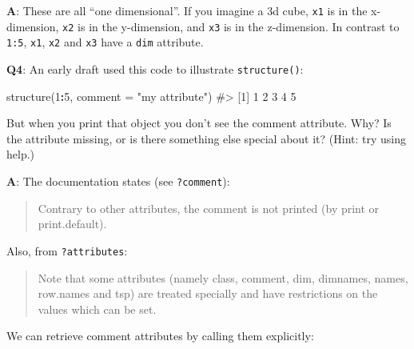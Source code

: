\documentclass[
]{krantz}
\makeatletter
\newenvironment{Shaded}{\begin{snugshade}}{\end{snugshade}}
\newcommand{\CommentTok}[1]{\textcolor[rgb]{0.56,0.35,0.01}{\textit{#1}}}
\newcommand{\DataTypeTok}[1]{\textcolor[rgb]{0.13,0.29,0.53}{#1}}
\newcommand{\DecValTok}[1]{\textcolor[rgb]{0.00,0.00,0.81}{#1}}
\newcommand{\KeywordTok}[1]{\textcolor[rgb]{0.13,0.29,0.53}{\textbf{#1}}}
\newcommand{\NormalTok}[1]{#1}
\newcommand{\OperatorTok}[1]{\textcolor[rgb]{0.81,0.36,0.00}{\textbf{#1}}}
\newcommand{\StringTok}[1]{\textcolor[rgb]{0.31,0.60,0.02}{#1}}
\newenvironment{kframe}{%
\medskip{}
\setlength{\fboxsep}{.8em}
 \def\at@end@of@kframe{}%
 \ifinner\ifhmode%
  \def\at@end@of@kframe{\end{minipage}}%
  \begin{minipage}{\columnwidth}%
 \fi\fi%
 \def\FrameCommand##1{\hskip\@totalleftmargin \hskip-\fboxsep
 \colorbox{shadecolor}{##1}\hskip-\fboxsep
     \hskip-\linewidth \hskip-\@totalleftmargin \hskip\columnwidth}%
 \MakeFramed {\advance\hsize-\width
   \@totalleftmargin\z@ \linewidth\hsize
   \@setminipage}}%
 {\par\unskip\endMakeFramed%
 \at@end@of@kframe}
\renewenvironment{Shaded}{\begin{kframe}}{\end{kframe}}
\renewcommand{\KeywordTok} [1]{\textcolor[rgb]{0.00,0.44,0.13}{{#1}}}
\renewcommand{\DataTypeTok}[1]{\textcolor[rgb]{0.56,0.13,0.00}{{#1}}}
\renewcommand{\DecValTok}  [1]{\textcolor[rgb]{0.25,0.63,0.44}{{#1}}}
\renewcommand{\StringTok}  [1]{\textcolor[rgb]{0.25,0.44,0.63}{{#1}}}
\renewcommand{\CommentTok} [1]{\textcolor[rgb]{0.38,0.63,0.69}{{#1}}}
\renewcommand{\NormalTok}  [1]{{#1}}
\makeatother
\begin{document}
\textbf{{A}}: These are all ``one dimensional''. If you imagine a 3d cube, \texttt{x1} is in the x-dimension, \texttt{x2} is in the y-dimension, and \texttt{x3} is in the z-dimension. In contrast to \texttt{1:5}, \texttt{x1}, \texttt{x2} and \texttt{x3} have a \texttt{dim} attribute.

\textbf{{Q4}}: An early draft used this code to illustrate \texttt{structure()}:

\begin{Shaded}
\begin{Highlighting}[]
\KeywordTok{structure}\NormalTok{(}\DecValTok{1}\OperatorTok{:}\DecValTok{5}\NormalTok{, }\DataTypeTok{comment =} \StringTok{"my attribute"}\NormalTok{)}
\CommentTok{#> [1] 1 2 3 4 5}
\end{Highlighting}
\end{Shaded}

But when you print that object you don't see the comment attribute. Why? Is the attribute missing, or is there something else special about it? (Hint: try using help.)

\textbf{{A}}: The documentation states (see \texttt{?comment}):

\begin{quote}
Contrary to other attributes, the comment is not printed (by print or print.default).
\end{quote}

Also, from \texttt{?attributes}:

\begin{quote}
Note that some attributes (namely class, comment, dim, dimnames, names, row.names and tsp) are treated specially and have restrictions on the values which can be set.
\end{quote}

We can retrieve comment attributes by calling them explicitly:

\begin{Shaded}
\end{Shaded}
\end{document}
